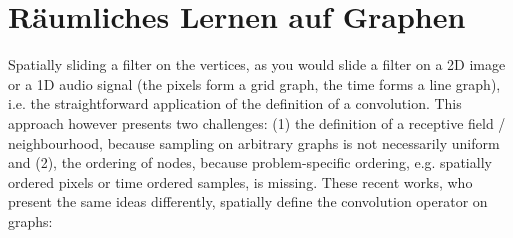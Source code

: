 \chapter{Räumliches Lernen auf Graphen}
\label{raeumliches_lernen}

Spatially sliding a filter on the vertices, as you would slide a filter on a 2D image or a 1D audio signal (the pixels form a grid graph, the time forms a line graph), i.e. the straightforward application of the definition of a convolution. This approach however presents two challenges: (1) the definition of a receptive field / neighbourhood, because sampling on arbitrary graphs is not necessarily uniform and (2), the ordering of nodes, because problem-specific ordering, e.g. spatially ordered pixels or time ordered samples, is missing. These recent works, who present the same ideas differently, spatially define the convolution operator on graphs:






